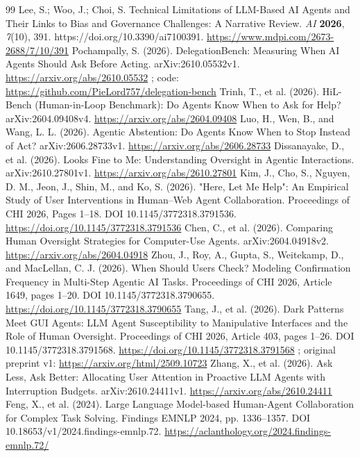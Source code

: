 \begin{thebibliography}{99}
 Lee, S.; Woo, J.; Choi, S. Technical Limitations of LLM-Based AI Agents and Their Links to Bias and Governance Challenges: A Narrative Review. \textit{AI} \textbf{2026}, \textit{7}(10), 391. https://doi.org/10.3390/ai7100391. \url{https://www.mdpi.com/2673-2688/7/10/391}
 Pochampally, S. (2026). DelegationBench: Measuring When AI Agents Should Ask Before Acting. arXiv:2610.05532v1. \url{https://arxiv.org/abs/2610.05532} ; code: \url{https://github.com/PieLord757/delegation-bench}
 Trinh, T., et al. (2026). HiL-Bench (Human-in-Loop Benchmark): Do Agents Know When to Ask for Help? arXiv:2604.09408v4. \url{https://arxiv.org/abs/2604.09408}
 Luo, H., Wen, B., and Wang, L. L. (2026). Agentic Abstention: Do Agents Know When to Stop Instead of Act? arXiv:2606.28733v1. \url{https://arxiv.org/abs/2606.28733}
 Dissanayake, D., et al. (2026). Looks Fine to Me: Understanding Oversight in Agentic Interactions. arXiv:2610.27801v1. \url{https://arxiv.org/abs/2610.27801}
 Kim, J., Cho, S., Nguyen, D. M., Jeon, J., Shin, M., and Ko, S. (2026). "Here, Let Me Help": An Empirical Study of User Interventions in Human--Web Agent Collaboration. Proceedings of CHI 2026, Pages 1--18. DOI 10.1145/3772318.3791536. \url{https://doi.org/10.1145/3772318.3791536}
 Chen, C., et al. (2026). Comparing Human Oversight Strategies for Computer-Use Agents. arXiv:2604.04918v2. \url{https://arxiv.org/abs/2604.04918}
 Zhou, J., Roy, A., Gupta, S., Weitekamp, D., and MacLellan, C. J. (2026). When Should Users Check? Modeling Confirmation Frequency in Multi-Step Agentic AI Tasks. Proceedings of CHI 2026, Article 1649, pages 1--20. DOI 10.1145/3772318.3790655. \url{https://doi.org/10.1145/3772318.3790655}
 Tang, J., et al. (2026). Dark Patterns Meet GUI Agents: LLM Agent Susceptibility to Manipulative Interfaces and the Role of Human Oversight. Proceedings of CHI 2026, Article 403, pages 1--26. DOI 10.1145/3772318.3791568. \url{https://doi.org/10.1145/3772318.3791568} ; original preprint v1: \url{https://arxiv.org/html/2509.10723}
 Zhang, X., et al. (2026). Ask Less, Ask Better: Allocating User Attention in Proactive LLM Agents with Interruption Budgets. arXiv:2610.24411v1. \url{https://arxiv.org/abs/2610.24411}
 Feng, X., et al. (2024). Large Language Model-based Human-Agent Collaboration for Complex Task Solving. Findings EMNLP 2024, pp. 1336--1357. DOI 10.18653/v1/2024.findings-emnlp.72. \url{https://aclanthology.org/2024.findings-emnlp.72/}

\end{thebibliography}
